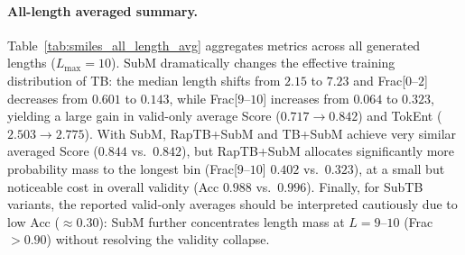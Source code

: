 \documentclass{article}
\theoremstyle{plain}
\theoremstyle{definition}
\theoremstyle{remark}
\begin{document}
\paragraph{All-length averaged summary.}
Table~\ref{tab:smiles_all_length_avg} aggregates metrics across all generated lengths ($L_{\max}=10$).
SubM dramatically changes the effective training distribution of TB: the median length shifts from $2.15$ to $7.23$ and
Frac[$0$--$2$] decreases from $0.601$ to $0.143$, while Frac[$9$--$10$] increases from $0.064$ to $0.323$,
yielding a large gain in valid-only average Score ($0.717\!\to\!0.842$) and TokEnt ($2.503\!\to\!2.775$).
With SubM, RapTB+SubM and TB+SubM achieve very similar averaged Score ($0.844$ vs.\ $0.842$),
but RapTB+SubM allocates significantly more probability mass to the longest bin (Frac[$9$--$10$] $0.402$ vs.\ $0.323$),
at a small but noticeable cost in overall validity (Acc $0.988$ vs.\ $0.996$).
Finally, for SubTB variants, the reported valid-only averages should be interpreted cautiously due to low Acc ($\approx 0.30$):
SubM further concentrates length mass at $L=9$--$10$ (Frac $>0.90$) without resolving the validity collapse.
\label{app:results_smiles_L10_main}
\end{document}

